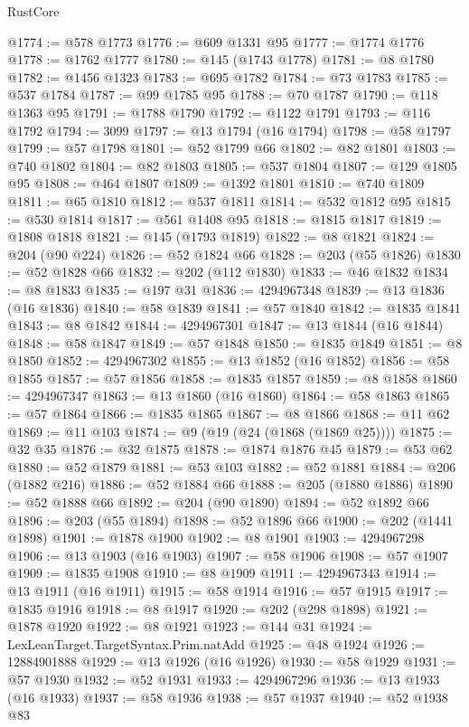 \begin{lexlean}{RustCore}
\begin{coremodule}
@1774 := @578 @1773
@1776 := @609 @1331 @95
@1777 := @1774 @1776
@1778 := @1762 @1777
@1780 := @145 (@1743 @1778)
@1781 := @8 @1780
@1782 := @1456 @1323
@1783 := @695 @1782
@1784 := @73 @1783
@1785 := @537 @1784
@1787 := @99 @1785 @95
@1788 := @70 @1787
@1790 := @118 @1363 @95
@1791 := @1788 @1790
@1792 := @1122 @1791
@1793 := @116 @1792
@1794 := 3099
@1797 := @13 @1794 (@16 @1794)
@1798 := @58 @1797
@1799 := @57 @1798
@1801 := @52 @1799 @66
@1802 := @82 @1801
@1803 := @740 @1802
@1804 := @82 @1803
@1805 := @537 @1804
@1807 := @129 @1805 @95
@1808 := @464 @1807
@1809 := @1392 @1801
@1810 := @740 @1809
@1811 := @65 @1810
@1812 := @537 @1811
@1814 := @532 @1812 @95
@1815 := @530 @1814
@1817 := @561 @1408 @95
@1818 := @1815 @1817
@1819 := @1808 @1818
@1821 := @145 (@1793 @1819)
@1822 := @8 @1821
@1824 := @204 (@90 @224)
@1826 := @52 @1824 @66
@1828 := @203 (@55 @1826)
@1830 := @52 @1828 @66
@1832 := @202 (@112 @1830)
@1833 := @46 @1832
@1834 := @8 @1833
@1835 := @197 @31
@1836 := 4294967348
@1839 := @13 @1836 (@16 @1836)
@1840 := @58 @1839
@1841 := @57 @1840
@1842 := @1835 @1841
@1843 := @8 @1842
@1844 := 4294967301
@1847 := @13 @1844 (@16 @1844)
@1848 := @58 @1847
@1849 := @57 @1848
@1850 := @1835 @1849
@1851 := @8 @1850
@1852 := 4294967302
@1855 := @13 @1852 (@16 @1852)
@1856 := @58 @1855
@1857 := @57 @1856
@1858 := @1835 @1857
@1859 := @8 @1858
@1860 := 4294967347
@1863 := @13 @1860 (@16 @1860)
@1864 := @58 @1863
@1865 := @57 @1864
@1866 := @1835 @1865
@1867 := @8 @1866
@1868 := @11 @62
@1869 := @11 @103
@1874 := @9 (@19 (@24 (@1868 (@1869 @25))))
@1875 := @32 @35
@1876 := @32 @1875
@1878 := @1874 @1876 @45
@1879 := @53 @62
@1880 := @52 @1879
@1881 := @53 @103
@1882 := @52 @1881
@1884 := @206 (@1882 @216)
@1886 := @52 @1884 @66
@1888 := @205 (@1880 @1886)
@1890 := @52 @1888 @66
@1892 := @204 (@90 @1890)
@1894 := @52 @1892 @66
@1896 := @203 (@55 @1894)
@1898 := @52 @1896 @66
@1900 := @202 (@1441 @1898)
@1901 := @1878 @1900
@1902 := @8 @1901
@1903 := 4294967298
@1906 := @13 @1903 (@16 @1903)
@1907 := @58 @1906
@1908 := @57 @1907
@1909 := @1835 @1908
@1910 := @8 @1909
@1911 := 4294967343
@1914 := @13 @1911 (@16 @1911)
@1915 := @58 @1914
@1916 := @57 @1915
@1917 := @1835 @1916
@1918 := @8 @1917
@1920 := @202 (@298 @1898)
@1921 := @1878 @1920
@1922 := @8 @1921
@1923 := @144 @31
@1924 := LexLeanTarget.TargetSyntax.Prim.natAdd
@1925 := @48 @1924
@1926 := 12884901888
@1929 := @13 @1926 (@16 @1926)
@1930 := @58 @1929
@1931 := @57 @1930
@1932 := @52 @1931
@1933 := 4294967296
@1936 := @13 @1933 (@16 @1933)
@1937 := @58 @1936
@1938 := @57 @1937
@1940 := @52 @1938 @83

\end{coremodule}
\end{lexlean}
